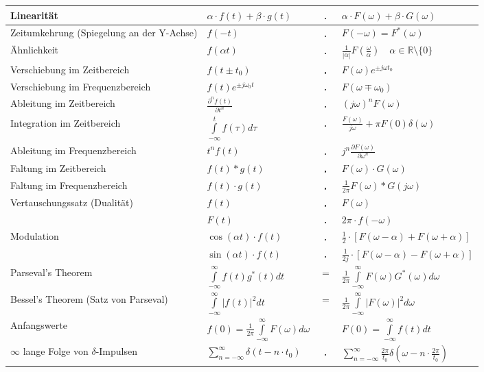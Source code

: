\begin{tabular}{|p{8cm}|l c l|}
  \hline
 	Linearität & 
 	$\alpha\cdot f(t) + \beta\cdot g(t)$ & $\FT$ & $\alpha\cdot F(\omega) + \beta\cdot G(\omega)$\\
 	\hline
  Zeitumkehrung (Spiegelung an der Y-Achse)&
  $f(-t)$ & $\FT$ & $F(-\omega) = F^*(\omega)$ \\
	\hline        	
	Ähnlichkeit &
	$f(\alpha t)$ & $\FT$ & $\frac{1}{|\alpha|}F \left (\frac{\omega}{\alpha} \right) \quad\alpha \in\mathbb{R}\setminus \{0\}$\\
	\hline
	Verschiebung im	Zeitbereich &
	$f(t\pm t_0)$ & $\FT$ & $F(\omega)e^{\pm j\omega t_0}$\\
	\hline
  Verschiebung im Frequenzbereich &
	$f(t)e^{\pm j\omega_0 t}$ & $\FT$ & $F(\omega\mp\omega_0)$\\
	\hline
	Ableitung im Zeitbereich &
	$\frac{\partial^n f(t)}{\partial t^n}$ & $\FT$ & $(j\omega)^n F(\omega)$\\
	\hline
	Integration im Zeitbereich &
	$\int\limits_{-\infty}^{t}f(\tau)d\tau $ & $\FT$ & 
	$\frac{F(\omega)}{j\omega}+\pi F(0)\delta(\omega)$\\
	\hline				
	Ableitung im Frequenzbereich &
	$t^n f(t)$ & $\FT$ & $j^n \frac{\partial F(\omega)}{\partial \omega^n}$\\
	\hline		
	Faltung im Zeitbereich &
	$f(t) \ast g(t)$ & $\FT$ & $F(\omega) \cdot G(\omega)$\\
	\hline
	Faltung im Frequenzbereich &
	$f(t) \cdot g(t)$ & $\FT$ & $\frac{1}{2\pi}F(\omega) \ast G(j\omega)$\\
	\hline
	Vertauschungssatz (Dualität) &
	$f(t)$ & $\FT$ & $F(\omega)\nonumber$ \\
	& $F(t)$ & $\FT$ & $2\pi \cdot f(-\omega)$\\
	\hline
	Modulation &
	$\cos(\alpha t) \cdot f(t)$ & $\FT$ & $\frac{1}{2}\cdot \left[F(\omega-\alpha) + F(\omega+\alpha)\right ]$\\
	& $\sin(\alpha t) \cdot f(t)$ & $\FT$ & $\frac{1}{2j}\cdot \left[	F(\omega-\alpha) - F(\omega+\alpha)\right ]$\\
	\hline
 	Parseval's Theorem &
  $\int\limits_{-\infty}^{\infty}f(t)g^{\ast}(t)dt $ & $=$ & $ \frac{1}{2\pi}	\int\limits_{-\infty}^{\infty}F(\omega)G^{\ast}(\omega)d\omega$\\
	\hline
	Bessel's Theorem (Satz von Parseval) &
	$\int\limits_{-\infty}^{\infty}|f(t)|^2 dt $ & $=$ & $ \frac{1}{2\pi}\int\limits_{-\infty}^{\infty}|F(\omega)|^2 d\omega$\\
	\hline 			
  Anfangswerte &
  $f(0)=\frac{1}{2\pi}\int\limits_{-\infty}^{\infty}F(\omega)d\omega$ 
  && $ F(0)=\int\limits_{-\infty}^{\infty}f(t)dt$\\
	\hline
	$\infty$ lange Folge von $\delta$-Impulsen &
	$\sum\limits_{n=-\infty}^{\infty} \delta(t-n\cdot t_0)$ & $\FT$ & 
	$\sum\limits_{n=-\infty}^{\infty} \frac{2\pi}{t_0}\delta(\omega-n\cdot \frac{2\pi}{t_0})$\\
	\hline
\end{tabular}
\renewcommand{\arraystretch}{1}

